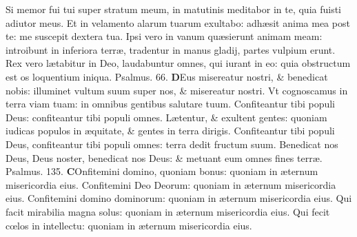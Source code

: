 \documentclass[a5paper,10pt]{book}
\def\ae{æ}
\def\oe{œ}
\begin{document}
\begin{multicols*}{2}
\newline \color{red} S\color{black}i memor fui tui super stratum meum, in matutinis meditabor in te, quia fuisti adiutor meus.
\newline \color{red} E\color{black}t in velamento alarum tuarum exultabo: adh\ae sit anima mea post te: me suscepit dextera tua.
\newline \color{red} I\color{black}psi vero in vanum qu\ae sierunt animam meam: introibunt in inferiora terr\ae , tradentur in manus gladij, partes vulpium erunt.
\newline \color{red} R\color{black}ex vero l\ae tabitur in Deo, laudabuntur omnes, qui iurant in eo: quia obstructum est os loquentium iniqua.
\newline \color{red} Psalmus. \hypertarget{ps66}{66.} \color{black}
\vspace{-.25em}
\lettrine[lines=2]{\bfseries \color{red} D}{}Eus misereatur nostri, \& benedicat nobis: illuminet vultum suum super nos, \& misereatur nostri.
\newline \color{red} V\color{black}t cognoscamus in terra viam tuam: in omnibus gentibus salutare tuum.
\newline \color{red} C\color{black}onfiteantur tibi populi Deus: confiteantur tibi populi omnes.
\newline \color{red} L\color{black}\ae tentur, \& exultent gentes: quoniam iudicas populos in \ae quitate, \& gentes in terra dirigis.
\newline \color{red} C\color{black}onfiteantur tibi populi Deus, confiteantur tibi populi omnes: terra dedit fructum suum.
\newline \color{red} B\color{black}enedicat nos Deus, Deus noster, benedicat nos Deus: \& metuant eum omnes fines terr\ae . \quad \color{red} Psalmus. \hypertarget{ps135}{135.} \color{black}
\vspace{-.25em}
\lettrine[lines=2]{\bfseries \color{red} C}{}Onfitemini domino, quoniam bonus: quoniam in \ae ternum misericordia eius.
\newline \color{red} C\color{black}onfitemini Deo Deorum: quoniam in \ae ternum misericordia eius.
\newline \color{red} C\color{black}onfitemini domino dominorum: quoniam in \ae ternum misericordia eius.
\newline \color{red} Q\color{black}ui facit mirabilia magna solus: quoniam in \ae ternum misericordia eius.
\newline \color{red} Q\color{black}ui fecit c\oe los in intellectu: quoniam in \ae ternum misericordia eius.

\end{multicols*}
\end{document}
